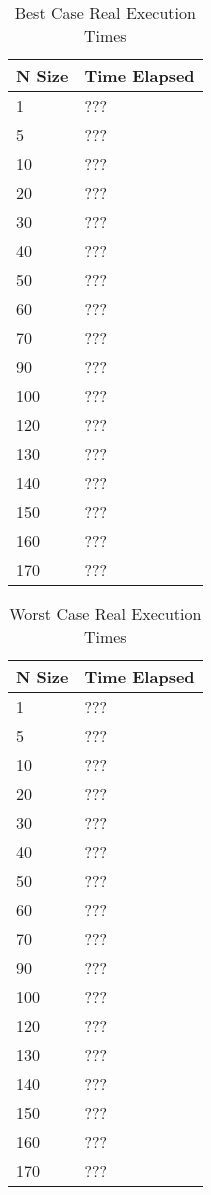 \documentclass[11pt, oneside, a4paper]{article}
\begin{document}
	\begin{table}[H]
		\centering
		\begin{tabular}{|l|l|} \hline
			\textbf{N Size} & \textbf{Time Elapsed} \\ \hline
			1 & ??? \\ \hline
			5 & ??? \\ \hline
			10 & ??? \\ \hline
			20 & ??? \\ \hline
			30 & ??? \\ \hline
			40 & ??? \\ \hline
			50 & ??? \\ \hline
			60 & ??? \\ \hline
			70 & ??? \\ \hline
			90 & ??? \\ \hline
			100 & ??? \\ \hline
			120 & ??? \\ \hline
			130 & ??? \\ \hline
			140 & ??? \\ \hline
			150 & ??? \\ \hline
			160 & ??? \\ \hline
			170 & ??? \\ \hline
		\end{tabular}
		\caption{Best Case Real Execution Times}
		\label{tab:best-case}
	\end{table}


	\begin{table}[H]
		\centering
		\begin{tabular}{|l|l|} \hline
			\textbf{N Size} & \textbf{Time Elapsed} \\ \hline
			1 & ??? \\ \hline
			5 & ??? \\ \hline
			10 & ??? \\ \hline
			20 & ??? \\ \hline
			30 & ??? \\ \hline
			40 & ??? \\ \hline
			50 & ??? \\ \hline
			60 & ??? \\ \hline
			70 & ??? \\ \hline
			90 & ??? \\ \hline
			100 & ??? \\ \hline
			120 & ??? \\ \hline
			130 & ??? \\ \hline
			140 & ??? \\ \hline
			150 & ??? \\ \hline
			160 & ??? \\ \hline
			170 & ??? \\ \hline
		\end{tabular}
		\caption{Worst Case Real Execution Times}
		\label{tab:worst-case}
	\end{table}
\end{document}
